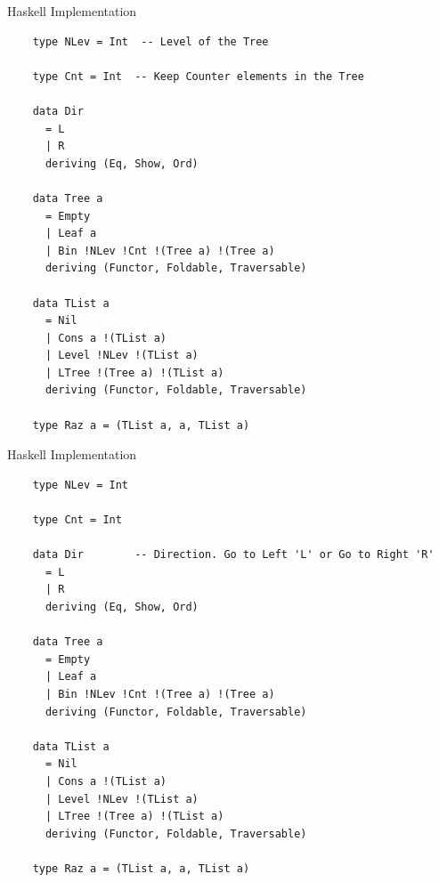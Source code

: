 \documentclass{beamer}
\begin{document}
\begin{frame}[fragile]{Haskell Implementation}

  \begin{verbatim}
    type NLev = Int  -- Level of the Tree

    type Cnt = Int  -- Keep Counter elements in the Tree

    data Dir
      = L
      | R
      deriving (Eq, Show, Ord)

    data Tree a
      = Empty
      | Leaf a
      | Bin !NLev !Cnt !(Tree a) !(Tree a)
      deriving (Functor, Foldable, Traversable)

    data TList a
      = Nil
      | Cons a !(TList a)
      | Level !NLev !(TList a)
      | LTree !(Tree a) !(TList a)
      deriving (Functor, Foldable, Traversable)

    type Raz a = (TList a, a, TList a)
  \end{verbatim}

\end{frame}


\begin{frame}[fragile]{Haskell Implementation}

  \begin{verbatim}
    type NLev = Int

    type Cnt = Int

    data Dir        -- Direction. Go to Left 'L' or Go to Right 'R'
      = L
      | R
      deriving (Eq, Show, Ord)

    data Tree a
      = Empty
      | Leaf a
      | Bin !NLev !Cnt !(Tree a) !(Tree a)
      deriving (Functor, Foldable, Traversable)

    data TList a
      = Nil
      | Cons a !(TList a)
      | Level !NLev !(TList a)
      | LTree !(Tree a) !(TList a)
      deriving (Functor, Foldable, Traversable)

    type Raz a = (TList a, a, TList a)
  \end{verbatim}

\end{frame}
\end{document}
